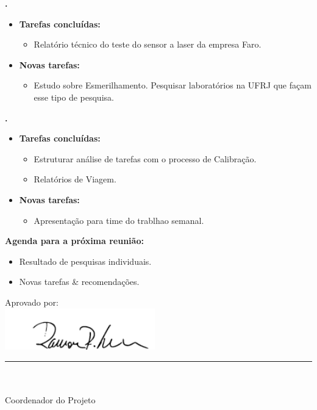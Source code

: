 	
	  \textbf{\elael.} 
	\begin{itemize}
		\item \textbf{Tarefas concluídas:}
			\begin{itemize}    
				\item Relatório técnico do teste do sensor a laser da empresa Faro.
			\end{itemize}
		
		\item \textbf{Novas tarefas:}
			\begin{itemize} 
			    \item Estudo sobre Esmerilhamento. Pesquisar laboratórios na UFRJ que
			    façam esse tipo de pesquisa.
			\end{itemize}
	\end{itemize}			
			
			
   \textbf{\julia.} 
	\begin{itemize}
		\item \textbf{Tarefas concluídas:}
			\begin{itemize}    
				\item Estruturar análise de tarefas com o processo de Calibração.
				\item Relatórios de Viagem.
			\end{itemize}
		
		\item \textbf{Novas tarefas:}
			\begin{itemize} 
			    \item Apresentação para time do trablhao semanal.
			\end{itemize}
	\end{itemize}		



\textbf{Agenda para a próxima reunião:}
  \begin{itemize}
    \item Resultado de pesquisas individuais.
    \item Novas tarefas \& recomendações.
  \end{itemize}


\vspace{5mm}%
\parbox[t]{70mm}{
  Aprovado por: \\[5mm]
  \centering
  \includegraphics[width=65mm]{figs/logo/assinatura-ramon.png} \\[-4mm]
  \rule[2mm]{70mm}{0.1mm} \\
  \ramon \\[1mm]
  Coordenador do Projeto \\
}

\fim